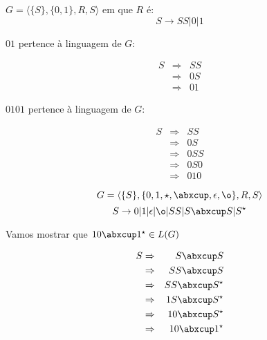 \begin{example}
$G = \langle \{S\}, \{0,1\}, R, S\rangle$ em que $R$ é:
\begin{displaymath}
  S \to SS | 0 | 1
\end{displaymath}
 
$01$ pertence à linguagem de $G$:

\begin{eqnarray*}
  S & \Rightarrow & SS\\
    & \Rightarrow & 0S \\
    & \Rightarrow & 01
\end{eqnarray*}

$0101$ pertence à linguagem de $G$:

\begin{eqnarray*}
  S & \Rightarrow & SS \\
    & \Rightarrow & 0S \\
    & \Rightarrow & 0SS \\
    & \Rightarrow & 0S0 \\
    & \Rightarrow & 010
\end{eqnarray*}
\end{example}


\begin{example}
\begin{displaymath}
G = \langle \{S\}, \{0, 1, \star, \abxcup, \epsilon, \o\}, R, S\rangle  
\end{displaymath}
\begin{displaymath}
  S \to 0 | 1 | \epsilon | \o | SS | S \abxcup S | S^\star
\end{displaymath}

Vamos mostrar que $10 \abxcup 1^\star \in L(G)$

\begin{eqnarray*}
  S & \Rightarrow & S \abxcup S \\
    & \Rightarrow & SS \abxcup S \\
    & \Rightarrow & SS \abxcup S^\star\\
    & \Rightarrow & 1S \abxcup S^\star\\
    & \Rightarrow & 10 \abxcup S^\star\\
    & \Rightarrow & 10 \abxcup 1^\star
\end{eqnarray*}
\end{example}


